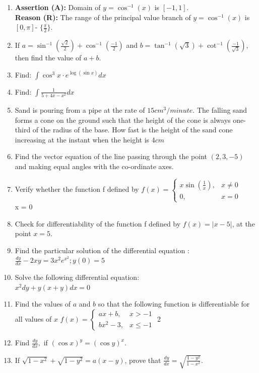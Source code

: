 \documentclass{article}
\providecommand{\brak}[1]{\ensuremath{\left(#1\right)}}
\begin{document}
\begin{enumerate}
	\item \textbf{Assertion (A):} Domain of $ y = \cos^{-1}(x) $ is $[-1, 1]$.\\
		\textbf{Reason (R):} The range of the principal value branch of $ y = \cos^{-1}(x) $ is $[0, \pi]$- $\{\frac{\pi}{2}\}$.


\item If $ a = \sin^{-1}\left(\frac{\sqrt{2}}{2}\right) + \cos^{-1}\left(\frac{-1}{2}\right) $ and $ b = \tan^{-1}(\sqrt{3}) + \cot^{-1}\left(\frac{-1}{\sqrt{3}}\right) $, then find the value of $a + b$.


\item Find: $\int \cos^3  x \cdot e^{\log(\sin x)}dx$

\item Find: $\int \frac{1}{5+4x-x^2}dx$	

\item Sand is pouring from a pipe at the rate of $ 15 cm^3/minute$. The falling sand forms a cone on the ground such that the height of the cone is always one- third of the radius of the base. How fast is the height of the sand cone increasing at the instant when the height is $4cm$	 

\item Find the vector equation of the line passing through the point $(2, 3, -5)$ and making equal angles with the co-ordinate axes.

\item Verify whether the function f defined by $f\brak{x} = \begin{cases} x \sin{\left(\frac{1}{x}\right)}, & x \neq 0 \\ 0, & x = 0 \end{cases} $\\
 x = 0 


\item Check for differentiability  of the function f defined by $f(x) = |x-5|$, at the point $x = 5$.


\item Find the particular solution of the  differential equation : \\
	$ \frac{dy}{dx} - 2xy = 3x^2e^{x^2} ; y(0)=5 $

\item Solve the following differential equation:\\
	$x^2 dy+y(x+y)dx=0$

\item Find the values of $a$ and $b$ so that the following function is differentiable for all values of $x$  $f\brak{x} = \begin{cases} ax+b, & x>-1 \\ bx^2-3, & x\le -1 \end{cases} $
2
\item Find $ \frac{dy}{dx},$ if $(\cos{x})^y = (\cos{y})^x.$
\item If $\sqrt{1-x^2} + \sqrt{1-y^2} =a(x-y)$, prove that $ \frac{dy}{dx}= \sqrt{\frac{1-y^2}{1-x^2}}.$




\end{enumerate}
\end{document}
